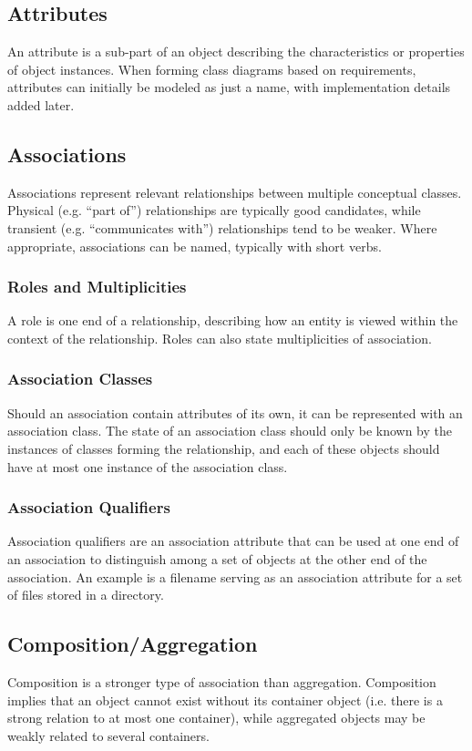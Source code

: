 \documentclass[12pt,titlepage]{article}
\begin{document}
    \subsection{Attributes}
      An attribute is a sub-part of an object describing the characteristics or properties of object instances. When forming class diagrams based on requirements, attributes can
      initially be modeled as just a name, with implementation details added later.

    \subsection{Associations}
      Associations represent relevant relationships between multiple conceptual classes. Physical (e.g. ``part of'') relationships are typically good candidates, while transient
      (e.g. ``communicates with'') relationships tend to be weaker. Where appropriate, associations can be named, typically with short verbs.

      \subsubsection{Roles and Multiplicities}
        A role is one end of a relationship, describing how an entity is viewed within the context of the relationship. Roles can also state multiplicities of association.

      \subsubsection{Association Classes}
        Should an association contain attributes of its own, it can be represented with an association class. The state of an association class should only be known by the instances
        of classes forming the relationship, and each of these objects should have at most one instance of the association class.

      \subsubsection{Association Qualifiers}
        Association qualifiers are an association attribute that can be used at one end of an association to distinguish among a set of objects at the other end of the association.
        An example is a filename serving as an association attribute for a set of files stored in a directory.

    \subsection{Composition/Aggregation}
      Composition is a stronger type of association than aggregation. Composition implies that an object cannot exist without its container object (i.e. there is a strong relation to
      at most one container), while aggregated objects may be weakly related to several containers.
\end{document}
